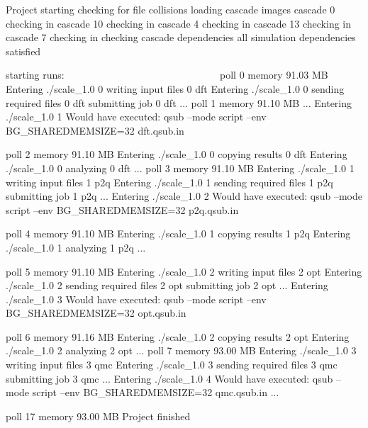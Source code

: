\else
\begin{shade}
Project starting 
  checking for file collisions 
  loading cascade images 
    cascade 0 checking in 
    cascade 10 checking in 
    cascade 4 checking in 
    cascade 13 checking in 
    cascade 7 checking in 
  checking cascade dependencies 
    all simulation dependencies satisfied 
  
  starting runs:
  ~~~~~~~~~~~~~~~~~~~~~~~~~~~~~~ 
  poll 0  memory 91.03 MB 
    Entering ./scale_1.0 0 
      writing input files  0 dft 
    Entering ./scale_1.0 0 
      sending required files  0 dft 
      submitting job  0 dft 
  ...
  poll 1  memory 91.10 MB 
  ...
    Entering ./scale_1.0 1 
      Would have executed:  qsub --mode script --env BG_SHAREDMEMSIZE=32 dft.qsub.in 

  poll 2  memory 91.10 MB 
    Entering ./scale_1.0 0 
      copying results  0 dft 
    Entering ./scale_1.0 0 
      analyzing  0 dft 
  ...
  poll 3  memory 91.10 MB 
    Entering ./scale_1.0 1 
      writing input files  1 p2q 
    Entering ./scale_1.0 1 
      sending required files  1 p2q 
      submitting job  1 p2q 
  ...
    Entering ./scale_1.0 2 
      Would have executed:  qsub --mode script --env BG_SHAREDMEMSIZE=32 p2q.qsub.in 

  poll 4  memory 91.10 MB 
    Entering ./scale_1.0 1 
      copying results  1 p2q 
    Entering ./scale_1.0 1 
      analyzing  1 p2q
  ... 

  poll 5  memory 91.10 MB 
    Entering ./scale_1.0 2 
      writing input files  2 opt 
    Entering ./scale_1.0 2 
      sending required files  2 opt 
      submitting job  2 opt 
  ...
    Entering ./scale_1.0 3 
      Would have executed:  qsub --mode script --env BG_SHAREDMEMSIZE=32 opt.qsub.in 

  poll 6  memory 91.16 MB 
    Entering ./scale_1.0 2 
      copying results  2 opt 
    Entering ./scale_1.0 2 
      analyzing  2 opt 
  ...
  poll 7  memory 93.00 MB 
    Entering ./scale_1.0 3 
      writing input files  3 qmc 
    Entering ./scale_1.0 3 
      sending required files  3 qmc 
      submitting job  3 qmc 
  ...
    Entering ./scale_1.0 4 
      Would have executed:  qsub --mode script --env BG_SHAREDMEMSIZE=32 qmc.qsub.in 
  ...

  poll 17  memory 93.00 MB 
Project finished
\end{shade}
\fi

